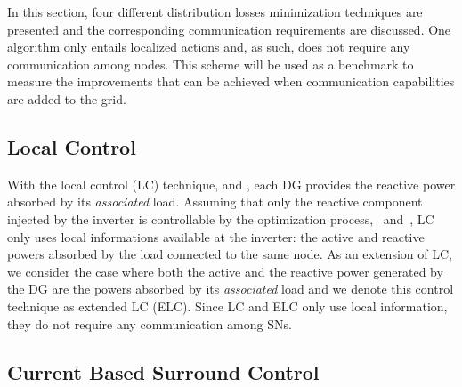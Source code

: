 \documentclass[journal]{IEEEtran}
\begin{document}
In this section, four different distribution losses minimization techniques are presented and the corresponding communication requirements are discussed. One algorithm only entails localized actions and, as such, does not require any communication among nodes. This scheme will be used as a benchmark to measure the improvements that can be achieved when communication capabilities are added to the grid. 

\subsection{Local Control}
\label{ssec:LControl}

With the local control (LC) technique, \cite{LC} and \cite{OptionsLC}, each DG provides the reactive power absorbed by its \textit{associated} load. Assuming that only the reactive component injected by the inverter is controllable by the optimization process,~\cite{LC} and~\cite{OptionsLC}, LC only uses local informations available at the inverter: the active and reactive powers absorbed by the load connected to the same node. As an extension of LC, we consider the case where both the active and the reactive power generated by the DG are the powers absorbed by its \textit{associated} load and we denote this control technique as extended LC (ELC). Since LC and ELC only use local information, they do not require any communication among SNs.

\subsection{Current Based Surround Control}
\label{ssec:CBControl}
\end{document}
